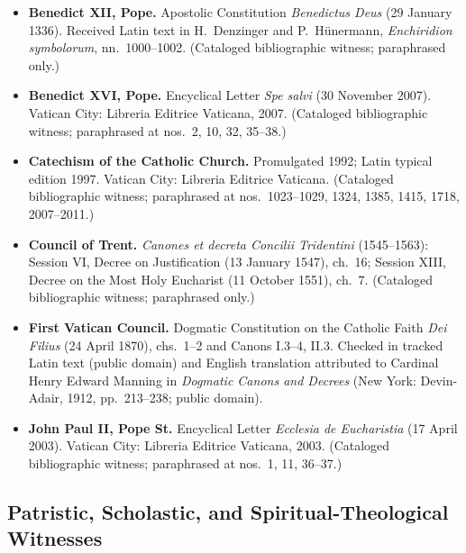 \begin{itemize}
\item \textbf{Benedict XII, Pope.} Apostolic Constitution \emph{Benedictus Deus} (29 January 1336). Received Latin text in H.\ Denzinger and P.\ H\"unermann, \emph{Enchiridion symbolorum}, nn.\ 1000--1002. (Cataloged bibliographic witness; paraphrased only.)
\item \textbf{Benedict XVI, Pope.} Encyclical Letter \emph{Spe salvi} (30 November 2007). Vatican City: Libreria Editrice Vaticana, 2007. (Cataloged bibliographic witness; paraphrased at nos.\ 2, 10, 32, 35--38.)
\item \textbf{Catechism of the Catholic Church.} Promulgated 1992; Latin typical edition 1997. Vatican City: Libreria Editrice Vaticana. (Cataloged bibliographic witness; paraphrased at nos.\ 1023--1029, 1324, 1385, 1415, 1718, 2007--2011.)
\item \textbf{Council of Trent.} \emph{Canones et decreta Concilii Tridentini} (1545--1563): Session VI, Decree on Justification (13 January 1547), ch.\ 16; Session XIII, Decree on the Most Holy Eucharist (11 October 1551), ch.\ 7. (Cataloged bibliographic witness; paraphrased only.)
\item \textbf{First Vatican Council.} Dogmatic Constitution on the Catholic Faith \emph{Dei Filius} (24 April 1870), chs.\ 1--2 and Canons I.3--4, II.3. Checked in tracked Latin text (public domain) and English translation attributed to Cardinal Henry Edward Manning in \emph{Dogmatic Canons and Decrees} (New York: Devin-Adair, 1912, pp.\ 213--238; public domain).
\item \textbf{John Paul II, Pope St.} Encyclical Letter \emph{Ecclesia de Eucharistia} (17 April 2003). Vatican City: Libreria Editrice Vaticana, 2003. (Cataloged bibliographic witness; paraphrased at nos.\ 1, 11, 36--37.)
\end{itemize}

\subsection*{Patristic, Scholastic, and Spiritual-Theological Witnesses}

